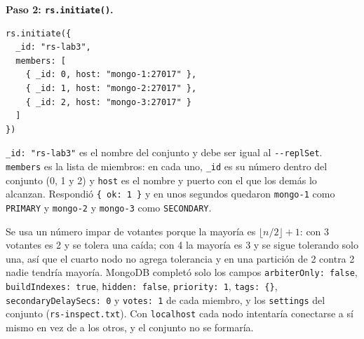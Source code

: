\documentclass[10pt,letterpaper]{article}
\begin{document}
\textbf{Paso 2: \texttt{rs.initiate()}.}

\begin{center}
\end{center}

\vspace{-2pt}
\begin{Verbatim}
rs.initiate({
  _id: "rs-lab3",
  members: [
    { _id: 0, host: "mongo-1:27017" },
    { _id: 1, host: "mongo-2:27017" },
    { _id: 2, host: "mongo-3:27017" }
  ]
})
\end{Verbatim}

\texttt{\_id: "rs-lab3"} es el nombre del conjunto y debe ser igual al \texttt{-{}-replSet}.
\texttt{members} es la lista de miembros: en cada uno, \texttt{\_id} es su número dentro del conjunto (0, 1
y 2) y \texttt{host} es el nombre y puerto con el que los demás lo alcanzan. Respondió \texttt{\{ ok: 1 \}}
y en unos segundos quedaron \texttt{mongo-1} como \texttt{PRIMARY} y \texttt{mongo-2} y \texttt{mongo-3}
como \texttt{SECONDARY}.

Se usa un número impar de votantes porque la mayoría es $\lfloor n/2 \rfloor + 1$: con 3 votantes es 2
y se tolera una caída; con 4 la mayoría es 3 y se sigue tolerando solo una, así que el cuarto nodo no
agrega tolerancia y en una partición de 2 contra 2 nadie tendría mayoría. MongoDB completó solo los campos
\texttt{arbiterOnly: false}, \texttt{buildIndexes: true}, \texttt{hidden: false}, \texttt{priority: 1},
\texttt{tags: \{\}}, \texttt{secondaryDelaySecs: 0} y \texttt{votes: 1} de cada miembro, y los
\texttt{settings} del conjunto (\texttt{rs-inspect.txt}). Con \texttt{localhost} cada nodo intentaría
conectarse a sí mismo en vez de a los otros, y el conjunto no se formaría.
\end{document}

